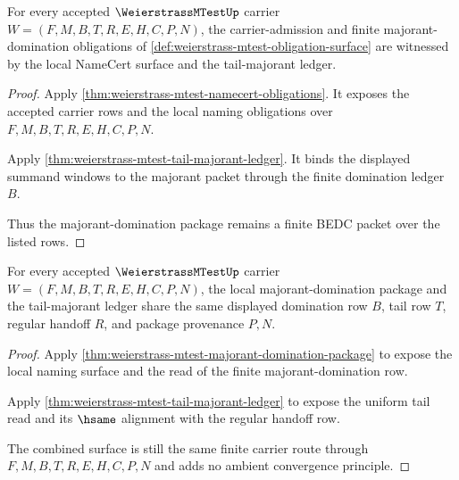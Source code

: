 \begin{theorem}
\label{thm:weierstrass-mtest-majorant-domination-package}
For every accepted $\WeierstrassMTestUp$ carrier $W=(F,M,B,T,R,E,H,C,P,N)$, the carrier-admission and finite majorant-domination obligations of \autoref{def:weierstrass-mtest-obligation-surface} are witnessed by the local NameCert surface and the tail-majorant ledger.
\end{theorem}
\begin{proof}
Apply \autoref{thm:weierstrass-mtest-namecert-obligations}. It exposes the accepted carrier rows and the local naming obligations over $F,M,B,T,R,E,H,C,P,N$.

Apply \autoref{thm:weierstrass-mtest-tail-majorant-ledger}. It binds the displayed summand windows to the majorant packet through the finite domination ledger $B$.

Thus the majorant-domination package remains a finite BEDC packet over the listed rows.
\end{proof}

\begin{theorem}
\label{thm:weierstrass-mtest-majorant-tail-domination-surface}
For every accepted $\WeierstrassMTestUp$ carrier $W=(F,M,B,T,R,E,H,C,P,N)$, the local majorant-domination package and the tail-majorant ledger share the same displayed domination row $B$, tail row $T$, regular handoff $R$, and package provenance $P,N$.
\end{theorem}
\begin{proof}
Apply \autoref{thm:weierstrass-mtest-majorant-domination-package} to expose the local naming surface and the read of the finite majorant-domination row.

Apply \autoref{thm:weierstrass-mtest-tail-majorant-ledger} to expose the uniform tail read and its $\hsame$ alignment with the regular handoff row.

The combined surface is still the same finite carrier route through $F,M,B,T,R,E,H,C,P,N$ and adds no ambient convergence principle.
\end{proof}

